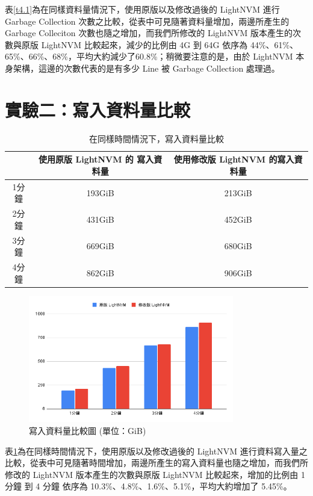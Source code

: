 \indent
表\ref{t4.1}為在同樣資料量情況下，使用原版以及修改過後的 LightNVM 進行Garbage Collection 次數之比較，從表中可見隨著資料量增加，兩邊所產生的 Garbage Colleciton 次數也隨之增加，而我們所修改的 LightNVM 版本產生的次數與原版 LightNVM 比較起來，減少的比例由 4G 到 64G 依序為 44\%、61\%、65\%、66\%、68\%，平均大約減少了60.8\%；稍微要注意的是，由於 LightNVM 本身架構，這邊的次數代表的是有多少 Line 被 Garbage Collection 處理過。

\section{實驗二：寫入資料量比較}\label{s4.3}

\begin{table}[H]
    \begin{center}
        \caption{在同樣時間情況下，寫入資料量比較}\label{t4.2}
        \begin{tabular}{|c|c|c|}\hline
                & 使用原版 LightNVM 的 寫入資料量 & 使用修改版 LightNVM 的寫入資料量 \\\hline
            1分鐘 & 193GiB                & 213GiB                \\\hline
            2分鐘 & 431GiB                & 452GiB                \\\hline
            3分鐘 & 669GiB                & 680GiB                \\\hline
            4分鐘 & 862GiB                & 906GiB                \\\hline
        \end{tabular}
    \end{center}
\end{table}

\begin{figure}[H]
    \centering
    \includegraphics[width=0.8\textwidth]{picture/ch4/write_chart.png}
    \caption{寫入資料量比較圖 (單位：GiB)}
    \label{f4.2}
\end{figure}

\indent
表\ref{t4.2}為在同樣時間情況下，使用原版以及修改過後的 LightNVM 進行資料寫入量之比較，從表中可見隨著時間增加，兩邊所產生的寫入資料量也隨之增加，而我們所修改的 LightNVM 版本產生的次數與原版 LightNVM 比較起來，增加的比例由 1 分鐘 到 4 分鐘 依序為 10.3\%、4.8\%、1.6\%、5.1\%，平均大約增加了 5.45\%。